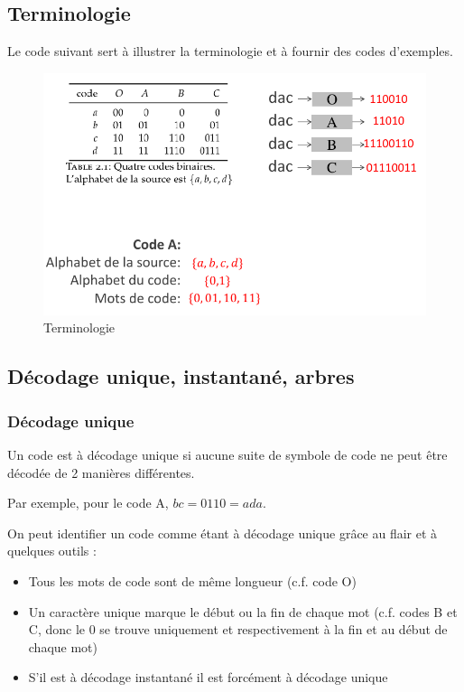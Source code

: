 \documentclass[11pt,a4paper]{article}
\begin{document}
\subsection{Terminologie}
Le code suivant sert à illustrer la terminologie et à fournir des codes d'exemples.
\begin{figure}[!h]
	\centering
	\includegraphics[scale=0.5]{images/terminologie_codage}
	\caption{Terminologie}
	\label{terminologie}
\end{figure}
\subsection{Décodage unique, instantané, arbres}
\subsubsection{Décodage unique}
Un code est à décodage unique si aucune suite de symbole de code ne peut être décodée de 2 manières différentes. 
\begin{exemple}[0.55]
	Par exemple, pour le code A, $bc = 0110 = ada$.
\end{exemple}
 On peut identifier un code comme étant à décodage unique grâce au flair et à quelques outils :
\begin{itemize}
	\item Tous les mots de code sont de même longueur (c.f. code O)
	\item Un caractère unique marque le début ou la fin de chaque mot (c.f. codes B et C, donc le 0 se trouve uniquement et respectivement à la fin et au début de chaque mot)
	\item S'il est à décodage instantané il est forcément à décodage unique
\end{itemize}
\end{document}
